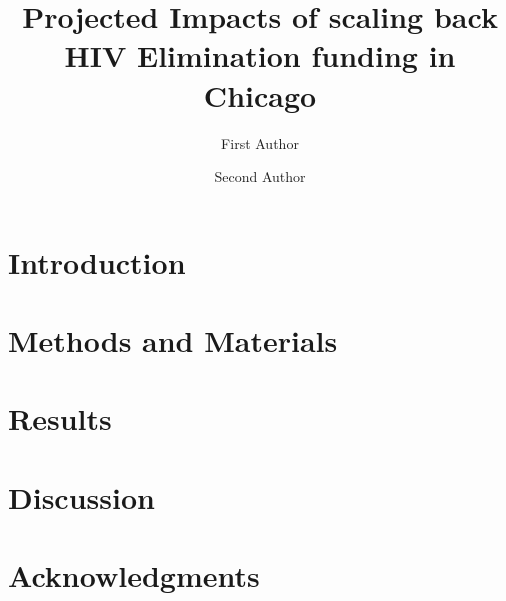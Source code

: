 \documentclass[fleqn,10pt]{olplainarticle}
\title{Projected Impacts of scaling back HIV Elimination funding in Chicago}
\author[1]{First Author}
\author[2]{Second Author}
\affil[1]{Address of first author}
\affil[2]{Address of second author}
\begin{document}
\flushbottom
\maketitle
\thispagestyle{empty}

\section*{Introduction}



\section*{Methods and Materials}

\section*{Results}

\section*{Discussion}

\section*{Acknowledgments}




\end{document}
